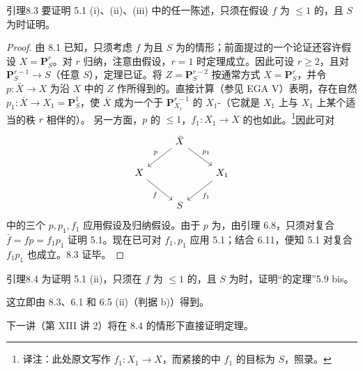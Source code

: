 \begin{SGAresult}{引理}{8.3}
要证明 5.1 (i)、(ii)、(iii) 中的任一陈述，只须在假设 $f$ 为 $\leq1$ 的，且 $S$ 为时证明。
\end{SGAresult}
\begin{proof}
由 8.1 已知，只须考虑 $f$ 为且 $S$ 为的情形；前面提过的一个论证还容许假设 $X=\mathbf P^r_S$。对 $r$ 归纳，注意由假设，$r=1$ 时定理成立。因此可设 $r\geq2$，且对 $\mathbf P^{r-1}_S\to S$（任意 $S$），定理已证。将 $Z=\mathbf P^{r-2}_S$ 按通常方式 $X=\mathbf P^r_S$，并令 $p:\bar X\to X$ 为沿 $X$ 中的 $Z$ 作所得到的。直接计算（参见 EGA V）表明，存在自然 $p_1:\bar X\to X_1=\mathbf P^1_S$，使 $\bar X$ 成为一个于 $\mathbf P^{r-1}_{X_1}$ 的 $X_1$-（它就是 $X_1$ 上与 $X_1$ 上某个适当的秩 $r$ 相伴的）。
另一方面，$p$ 的 $\leq1$，$f_1:X_1\to X$ 的也如此。\footnote{译注：此处原文写作 $f_1:X_1\to X$，而紧接的中 $f_1$ 的目标为 $S$，照录。}因此可对
\[
\begin{tikzcd}
&\bar X\arrow[dl,"p"']\arrow[dr,"p_1"]&\\
X\arrow[dr,"f"']&&X_1\arrow[dl,"f_1"]\\
&S&
\end{tikzcd}
\]
中的三个 $p,p_1,f_1$ 应用假设及归纳假设。由于 $p$ 为，由引理 6.8，只须对复合 $\bar f=fp=f_1p_1$ 证明 5.1。现在已可对 $f_1,p_1$ 应用 5.1；结合 6.11，便知 5.1 对复合 $f_1p_1$ 也成立。8.3 证毕。
\end{proof}

\begin{SGAresult}{引理}{8.4}
为证明 5.1 (ii)，只须在 $f$ 为 $\leq1$ 的，且 $S$ 为时，证明“的定理”5.9 bis。
\end{SGAresult}
这立即由 8.3、6.1 和 6.5 (ii)（判据 b)）得到。

下一讲（第 XIII 讲 2）将在 8.4 的情形下直接证明定理。

